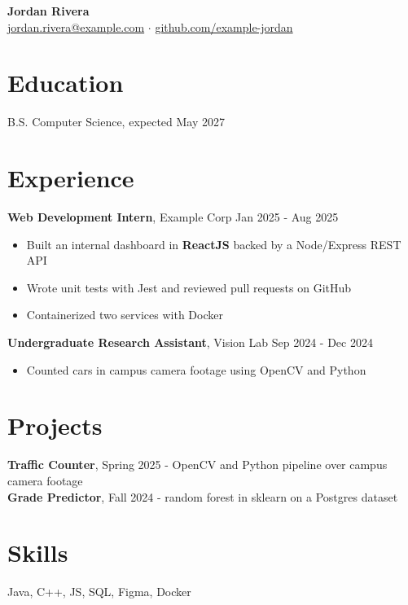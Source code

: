 \documentclass[letterpaper,11pt]{article}
\begin{document}
\textbf{\Large Jordan Rivera} \\
\href{mailto:jordan.rivera@example.com}{jordan.rivera@example.com} $\cdot$ \href{https://github.com/example-jordan}{github.com/example-jordan}

\section{Education}
B.S. Computer Science, expected May 2027

\section{Experience}
\textbf{Web Development Intern}, Example Corp \hfill Jan 2025 - Aug 2025
\begin{itemize}
  \item Built an internal dashboard in \textbf{ReactJS} backed by a Node/Express REST API
  \item Wrote unit tests with Jest and reviewed pull requests on GitHub
  \item Containerized two services with Docker
\end{itemize}

\textbf{Undergraduate Research Assistant}, Vision Lab \hfill Sep 2024 - Dec 2024
\begin{itemize}
  \item Counted cars in campus camera footage using OpenCV and Python
\end{itemize}

\section{Projects}
\textbf{Traffic Counter}, Spring 2025 - OpenCV and Python pipeline over campus camera footage \\
\textbf{Grade Predictor}, Fall 2024 - random forest in sklearn on a Postgres dataset

\section{Skills}
Java, C++, JS, SQL, Figma, Docker
\end{document}
